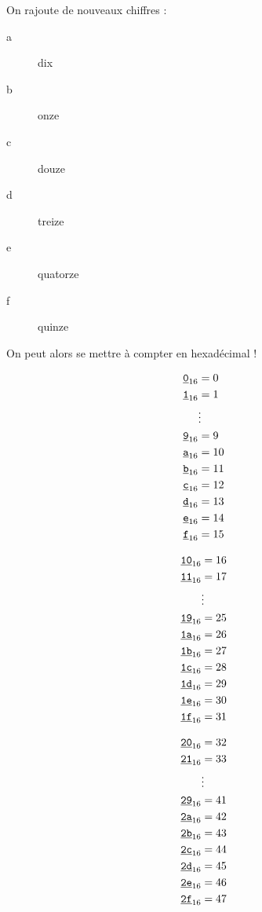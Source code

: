 On rajoute de nouveaux \og chiffres \fg{}:
\begin{description}
\item[a] dix
\item[b] onze
\item[c] douze
\item[d] treize
\item[e] quatorze
\item[f] quinze
\end{description}
On peut alors se mettre à compter en hexadécimal !
\vskip-1pt
\noindent\begin{minipage}[t]{0.18\linewidth}
\footnotesize{}
\begin{align*}
\hex{0} &= 0\\
\hex{1} &= 1\\
&\vdots\\
\hex{9} &= 9\\
\hex{a} &= 10\\
\hex{b} &= 11\\
\hex{c} &= 12\\
\hex{d} &= 13\\
\hex{e} &= 14\\
\hex{f} &= 15\\
\end{align*}
\end{minipage}
\begin{minipage}[t]{0.18\linewidth}
\footnotesize{}
\begin{align*}
\hex{10} &= 16\\
\hex{11} &= 17\\
&\vdots\\
\hex{19} &= 25\\
\hex{1a} &= 26\\
\hex{1b} &= 27\\
\hex{1c} &= 28\\
\hex{1d} &= 29\\
\hex{1e} &= 30\\
\hex{1f} &= 31\\
\end{align*}
\end{minipage}
\begin{minipage}[t]{0.18\linewidth}
\footnotesize{}
\begin{align*}
\hex{20} &= 32\\
\hex{21} &= 33\\
&\vdots\\
\hex{29} &= 41\\
\hex{2a} &= 42\\
\hex{2b} &= 43\\
\hex{2c} &= 44\\
\hex{2d} &= 45\\
\hex{2e} &= 46\\
\hex{2f} &= 47\\
\end{align*}
\end{minipage}
